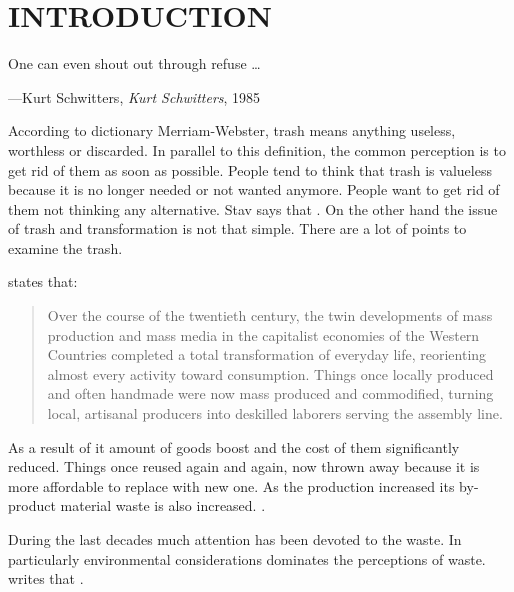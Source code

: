 \chapter{INTRODUCTION}



\begin{singlespace}
\epigraph{One can even shout out through refuse \ldots}{\hfill---Kurt Schwitters, \textit{Kurt Schwitters}, 1985}
\end{singlespace}



According to dictionary Merriam-Webster, trash means anything useless, worthless or discarded. In parallel to this definition, the common perception is to get rid of them as soon as possible. People tend to think that trash is valueless because it is no longer needed or not wanted anymore. People want to get rid of them not thinking any alternative. Stav says that  \citep[as cited in][]{navarro2015followingtrash}. On the other hand the issue of trash and transformation is not that simple. There are a lot of points to examine the trash.

\cite[11]{banash2013collage} states that:
\begin{quote}
Over the course of the twentieth century, the twin developments of mass production and mass media in the capitalist economies of the Western Countries completed a total transformation of everyday life, reorienting almost every activity toward consumption. Things once locally produced and often handmade were now mass produced and commodified, turning local, artisanal producers into deskilled laborers serving the assembly line.
\end{quote}
As a result of it amount of goods boost and the cost of them significantly reduced. Things once reused again and again, now thrown away because it is more affordable to replace with new one. As the production increased its by-product material waste is also increased.  \citep{pye2010trashculture}.

During the last decades much attention has been devoted to the waste. In particularly environmental considerations dominates the perceptions of waste. \cite{ibarra2015beautiful} writes that .

